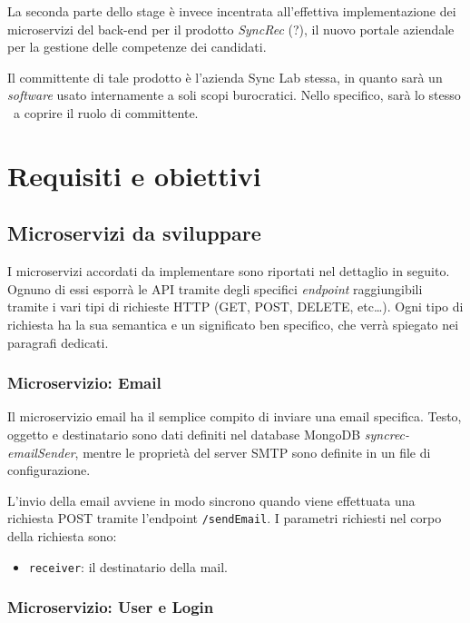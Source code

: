 La seconda parte dello stage è invece incentrata all'effettiva implementazione dei microservizi del back-end per il prodotto \textit{SyncRec} (?), il nuovo portale aziendale per la gestione delle competenze dei candidati.

Il committente di tale prodotto è l'azienda Sync Lab stessa, in quanto sarà un \textit{software} usato internamente a soli scopi burocratici.
Nello specifico, sarà lo stesso \fabio\ a coprire il ruolo di committente.

\section{Requisiti e obiettivi}

\subsection{Microservizi da sviluppare}

I microservizi accordati da implementare sono riportati nel dettaglio in seguito. Ognuno di essi esporrà le API tramite degli specifici \textit{endpoint}
raggiungibili tramite i vari tipi di richieste HTTP (GET, POST, DELETE, etc\dots).
Ogni tipo di richiesta ha la sua semantica e un significato ben specifico, che verrà spiegato nei paragrafi dedicati.

\subsubsection{Microservizio: Email}

Il microservizio email ha il semplice compito di inviare una email specifica.
Testo, oggetto e destinatario sono dati definiti nel database MongoDB
\textit{syncrec-emailSender}, mentre le proprietà del server SMTP sono definite in un file di configurazione.

L'invio della email avviene in modo sincrono quando viene effettuata una richiesta POST tramite l'endpoint \texttt{/sendEmail}.
I parametri richiesti nel corpo della richiesta sono:
\begin{itemize}
	\item \texttt{receiver}: il destinatario della mail.
\end{itemize}

\subsubsection{Microservizio: User e Login}

